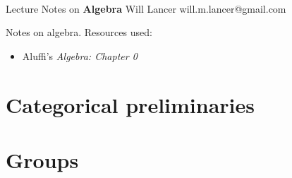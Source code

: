 \documentclass[11pt]{article}
\begin{document}
\thispagestyle{empty}
\bigskip \
\vspace{0.1cm}

\begin{center}
{\fontsize{22}{22} \selectfont Lecture Notes on}
\vskip 16pt
{\fontsize{36}{36} \selectfont \bf \sffamily Algebra}
\vskip 24pt
{\fontsize{18}{18} \selectfont \rmfamily Will Lancer} 
\vskip 6pt
{\fontsize{14}{14} \selectfont \ttfamily will.m.lancer@gmail.com} 
\vskip 24pt
\end{center}

{\parindent0pt \baselineskip=15.5pt}
\noin
Notes on algebra. Resources used:
\begin{itemize}
    \item Aluffi's \emph{Algebra: Chapter 0}
\end{itemize}

\newpage
\microtoc
\newpage

\section{Categorical preliminaries}


\section{Groups}
\end{document}

